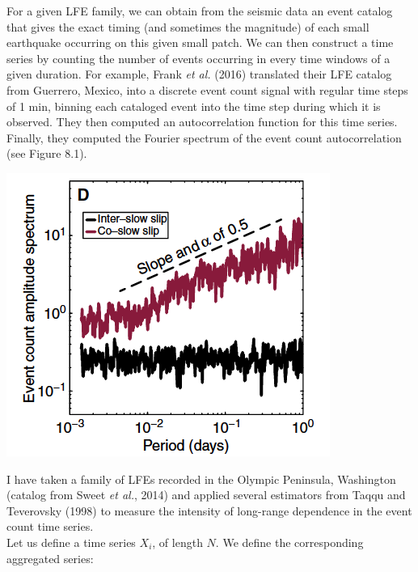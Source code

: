 \documentclass[workdone.tex]{subfiles}
\begin{document}
For a given LFE family, we can obtain from the seismic data an event catalog that gives the exact timing (and sometimes the magnitude) of each small earthquake occurring on this given small patch. We can then construct a time series by counting the number of events occurring in every time windows of a given duration. For example, Frank \textit{et al.} (2016) translated their LFE catalog from Guerrero, Mexico, into a discrete event count signal with regular time steps of 1 min, binning each cataloged event into the time step during which it is observed. They then computed an autocorrelation function for this time series. Finally, they computed the Fourier spectrum of the event count autocorrelation (see Figure 8.1). \\

\begin{center}
\includegraphics[width=300pt, trim={0cm 0cm 0cm 0cm},clip]{Figures/longrange/Frank_et_al_2016_Fig2D.png}
\captionsetup{type=figure}
\end{center}

I have taken a family of LFEs recorded in the Olympic Peninsula, Washington (catalog from Sweet \textit{et al.}, 2014) and applied several estimators from Taqqu and Teverovsky (1998) to measure the intensity of long-range dependence in the event count time series. \\

Let us define a time series $X_i$, of length $N$. We define the corresponding aggregated series:
\end{document}
